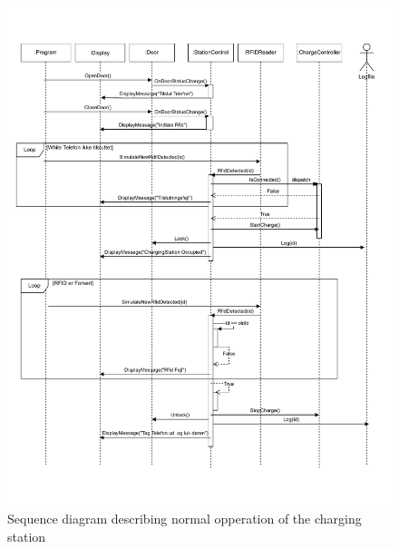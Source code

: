 \begin{figure}[h]
  \centering
  \includegraphics[width=\textwidth]{02-Body/images/SEQpdf.pdf}
  \caption{Sequence diagram describing normal opperation of the charging station}
  \label{fig:seq-diagram}
\end{figure}


